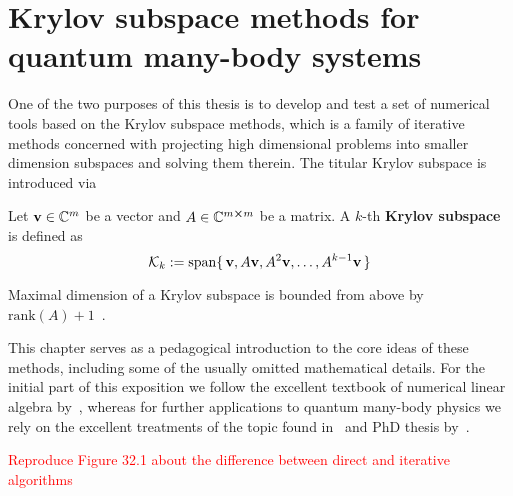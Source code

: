 
\chapter{Krylov subspace methods for quantum many-body systems}
\thispagestyle{chapterBeginStyle}

One of the two purposes of this thesis is to develop and test a set of numerical tools based on the Krylov subspace methods,
which is a family of iterative methods concerned with projecting high dimensional problems into smaller dimension subspaces
and solving them therein. The titular Krylov subspace is introduced via
\begin{definition}
	Let \(\vectorbold{v} \in \CC^{m}\) be a vector and \(A\in \mathbb{C}^{m\cross m}\) be a matrix. A \(k\)-th 
	\textbf{Krylov subspace} is defined as
	\begin{equation*}
		\K{k} := \mathrm{span}\{\,\vectorbold{v}, A\vectorbold{v}, A^2\vectorbold{v},\ldots,A^{k-1}\vectorbold{v} \,\}
	\end{equation*}
	\label{def:krylov}
\end{definition}
Maximal dimension of a Krylov subspace is bounded from above by \(\mathrm{rank}(A) + 1\)~\autocite{Simoncini2015}.

This chapter serves as a
pedagogical introduction to the core ideas of these methods, including some of the usually omitted mathematical details.
For the initial part of this exposition we follow the excellent textbook of numerical linear algebra by~\textcite{Trefethen1997},
whereas for further applications to quantum many-body physics we rely on the excellent treatments of the topic
found in~\textcite{Sandvik2010} and PhD thesis by~\textcite{Crivelli2016}.

\textcolor{red}{Reproduce Figure 32.1 about the difference between direct and iterative algorithms}

